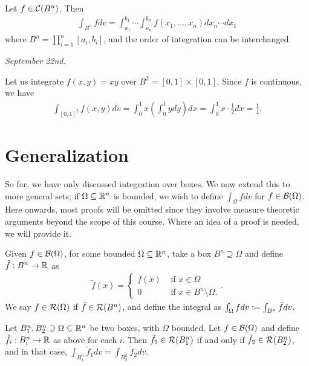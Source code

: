 \begin{corollary}
    Let $f \in \mathcal{C}(B^{n})$. Then 
    \begin{align}
        \int_{B^{n}} f dv = \int_{a_{1}}^{b_{1}} \cdots \int_{a_{n}}^{b_{n}} f(x_{1},\ldots,x_{n}) dx_{n} \cdots dx_{1}
    \end{align}
    where $B^{n} = \prod_{i=1}^{n} [a_{i},b_{i}]$, and the order of integration can be interchanged.
\end{corollary}

\textit{September 22nd.}
\begin{example}
    Let us integrate $f(x,y) = xy$ over $B^{2} = [0,1] \times [0,1]$. Since $f$ is continuous, we have
    \begin{align}
        \int_{[0,1]^{2}} f(x,y) dv = \int_{0}^{1} x\left( \int_{0}^{1}ydy \right)dx = \int_{0}^{1} x \cdot \frac{1}{2} dx = \frac{1}{4}.
    \end{align}
\end{example}

\section{Generalization}

So far, we have only discussed integration over boxes. We now extend this to more general sets; if $\Omega \subseteq \mathbb{R}^{n}$ is bounded, we wish to define $\int_{\Omega} f dv$ for $f \in \mathcal{B}(\Omega)$. Here onwards, most proofs will be omitted since they involve measure theoretic arguments beyond the scope of this course. Where an idea of a proof is needed, we will provide it.

\begin{definition}
    Given $f \in \mathcal{B}(\Omega)$, for some bounded $\Omega \subseteq \mathbb{R}^{n}$, take a box $B^{n} \supseteq \Omega$ and define $\tilde{f}:B^{n} \to \mathbb{R}$ as
    \begin{align}
        \tilde{f}(x) = \begin{cases}
            f(x) &\text{ if } x \in \Omega \\
            0 &\text{ if } x \in B^{n} \setminus \Omega.
        \end{cases}.
    \end{align}
    We say $f \in \mathcal{R}(\Omega)$ if $\tilde{f} \in \mathcal{R}(B^{n})$, and define the integral as $\int_{\Omega} f dv \vcentcolon= \int_{B^{n}} \tilde{f} dv$.
\end{definition}

\begin{theorem}
    Let $B_{1}^{n}, B_{2}^{n} \supseteq \Omega \subseteq \mathbb{R}^{n}$ be two boxes, with $\Omega$ bounded. Let $f \in \mathcal{B}(\Omega)$ and define $\tilde{f}_{i}:B_{i}^{n} \to \mathbb{R}$ as above for each $i$. Then $\tilde{f}_{1} \in \mathcal{R}(B_{1}^{n})$ if and only if $\tilde{f}_{2} \in \mathcal{R}(B_{2}^{n})$, and in that case, $\int_{B_{1}^{n}} \tilde{f}_{1} dv = \int_{B_{2}^{n}} \tilde{f}_{2} dv$.
\end{theorem}

